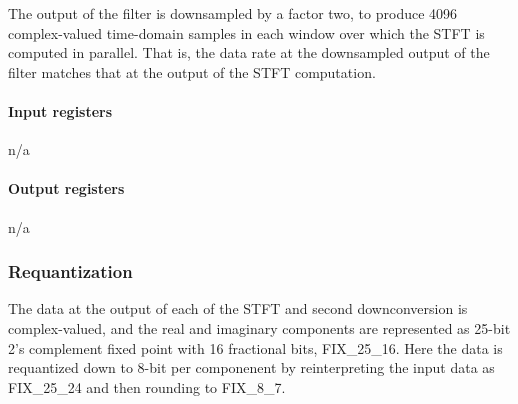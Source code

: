 \documentclass[a4paper,10pt]{article}
\begin{document}
\begin{table}[h]
	\caption{First bi-quadratic structure of elliptic low-pass filter.}
	\label{tab:biquad1}
\end{table}

\begin{table}[h]
	\caption{Second bi-quadratic structure of elliptic low-pass filter.}
	\label{tab:biquad2}
\end{table}

The output of the filter is downsampled by a factor two, to produce
4096 complex-valued time-domain samples in each window over which the 
STFT is computed in parallel. That is, the data rate at the downsampled 
output of the filter matches that at the output of the STFT computation.

\paragraph{Input registers}
n/a

\paragraph{Output registers}
n/a

\subsubsection{Requantization}
\label{sec:gwdcpquant}
The data at the output of each of the STFT and second downconversion is
complex-valued, and the real and imaginary components are represented as 
25-bit 2's complement fixed point with 16 fractional bits, FIX\_25\_16. 
Here the data is requantized down to 8-bit per componenent by 
reinterpreting the input data as FIX\_25\_24 and then rounding to 
FIX\_8\_7.
\end{document}
